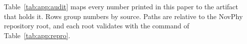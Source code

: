 Table~\ref{tab:app:audit} maps every number printed in this paper to the artifact that holds it. Rows group numbers by source. Paths are relative to the NovPhy repository root, and each root validates with the command of Table~\ref{tab:app:repro}.

